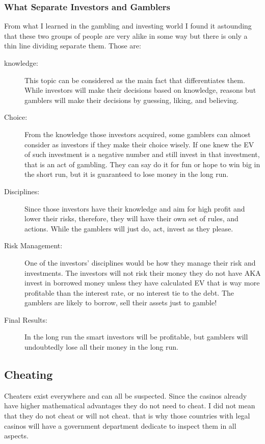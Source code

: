 \documentclass{article}
\begin{document}
\subsubsection{What Separate Investors and Gamblers}
From what I learned in the gambling and investing world I found it astounding that these two groups of people are very alike in some way but there is only a thin line dividing separate them.  Those are:\par
\begin{description}
\item[knowledge:] This topic can be considered as the main fact that differentiates them.  While investors will make their decisions based on knowledge, reasons but gamblers will make their decisions by guessing, liking, and believing.
\item[Choice:]  From the knowledge those investors acquired, some gamblers can almost consider as investors if they make their choice wisely.  If one knew the EV of such investment is a negative number and still invest in that investment, that is an act of gambling.  They can say do it for fun or hope to win big in the short run, but it is guaranteed to lose money in the long run.
\item[Disciplines:] Since those investors have their knowledge and aim for high profit and lower their risks, therefore, they will have their own set of rules, and actions.  While the gamblers will just do, act, invest as they please.
\item[Risk Management:] One of the investors' disciplines would be how they manage their risk and investments.   The investors will not risk their money they do not have AKA invest in borrowed money unless they have calculated EV that is way more profitable than the interest rate, or no interest tie to the debt.  The gamblers are likely to borrow, sell their assets just to gamble! 
\item[Final Results:] In the long run the smart investors will be profitable, but gamblers will undoubtedly lose all their money in the long run.
\end{description}

\subsection{Cheating}
Cheaters exist everywhere and can all be suspected.  Since the casinos already have higher mathematical advantages they do not need to cheat.  I did not mean that they do not cheat or will not cheat.  that is why those countries with legal casinos will have a government department dedicate to inspect them in all aspects.\\
\end{document}
